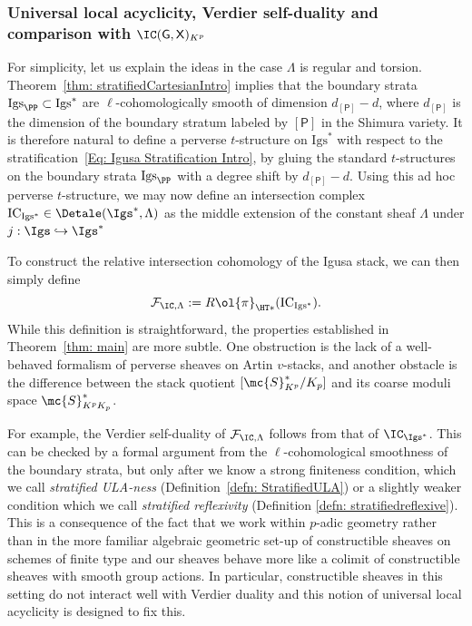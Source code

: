 \documentclass[letterpaper,11pt]{amsart}
\begin{document}
\subsubsection{Universal local acyclicity, Verdier self-duality and comparison with $\IC(\mathsf{G},\mathsf{X})_{K^p}$} For simplicity, let us explain the ideas in the case $\Lambda$ is regular and torsion. Theorem~\ref{thm: stratifiedCartesianIntro} implies that the boundary strata $\mathrm{Igs}_{\PP}\subset \mathrm{Igs}^*$ are $\ell$-cohomologically smooth of dimension $d_{[\mathsf{P}]}-d$, where $d_{[\mathsf{P}]}$ is the dimension of the boundary stratum labeled by $[\mathsf{P}]$ in the Shimura variety. It is therefore natural to define a perverse $t$-structure on $\mathrm{Igs}^*$ with respect to the stratification~\eqref{Eq: Igusa Stratification Intro}, by gluing the standard $t$-structures on the boundary strata $\mathrm{Igs}_{\PP}$ with a degree shift by $d_{[\mathsf{P}]}-d$. Using this ad hoc perverse $t$-structure, we may now define an intersection complex $\mathrm{IC}_{\mathrm{Igs^\ast}}\in \Detale(\Igs^\ast,\Lambda)$ as the middle extension of the constant sheaf $\Lambda$ under $j: \Igs\hookrightarrow\Igs^\ast$

To construct the relative intersection cohomology of the Igusa stack, we can then simply define 
\[
\mathcal{F}_{\IC,\Lambda}:= R\ol{\pi}_{\HT*}(\mathrm{IC}_{\mathrm{Igs^\ast}}).
\] 
While this definition is straightforward, the properties established in Theorem~\ref{thm: main} are more subtle. 
One obstruction is the lack of a well-behaved formalism of perverse sheaves on Artin $v$-stacks, and another obstacle is the difference between the stack quotient $[\mc{S}^\ast_{K^p}/K_p]$ and its coarse moduli space $\mc{S}_{K^pK_p}^\ast$. 

For example, 
the Verdier self-duality of $\mathcal{F}_{\IC,\Lambda}$ follows from that of $\IC_{\Igs^\ast}$. This can be checked by a formal argument from the $\ell$-cohomological smoothness of the boundary strata, but only after we know a strong finiteness condition, which we call \emph{stratified ULA-ness} (Definition~\ref{defn: StratifiedULA}) or a slightly weaker condition which we call \emph{stratified reflexivity} (Definition \ref{defn: stratifiedreflexive}). This is a consequence of the fact that we work within $p$-adic geometry rather than in the more familiar algebraic geometric set-up of constructible sheaves on schemes of finite type and our sheaves behave more like a colimit of constructible sheaves with smooth group actions. In particular, constructible sheaves in this setting do not interact well with Verdier duality and this notion of universal local acyclicity is designed to fix this. 
\end{document}
